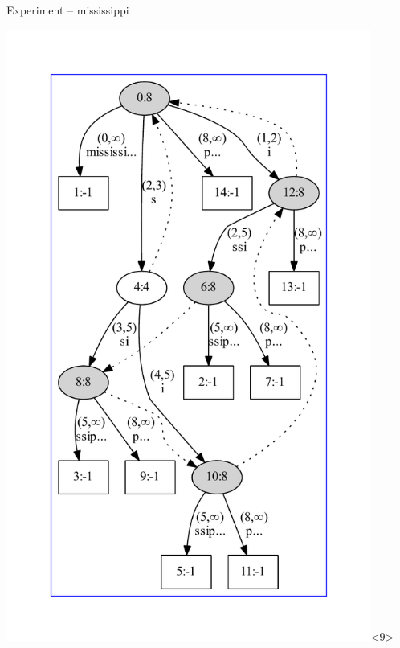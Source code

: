 \begin{frame}{Experiment -- mississippi}
\begin{overlayarea}{\textwidth}{\textheight}
\includegraphics[keepaspectratio,height=0.9\textheight,width=0.9\textwidth]{mississip.pdf}<9>

\end{overlayarea}
\end{frame}

